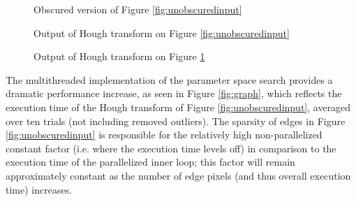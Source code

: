 \documentclass[letterpaper,12pt]{article}
\begin{document}
\begin{figure}[H]
    \caption{Obscured version of Figure \ref{fig:unobscuredinput}}
    \label{fig:obscuredinput}
\end{figure}

\begin{figure}[H]
    \caption{Output of Hough transform on Figure \ref{fig:unobscuredinput}}
    \label{fig:unobscuredoutput}
\end{figure}

\begin{figure}[H]
    \caption{Output of Hough transform on Figure \ref{fig:obscuredinput}}
    \label{fig:obscuredoutput}
\end{figure}
The multithreaded implementation of the parameter space search provides a dramatic performance increase,
as seen in Figure \ref{fig:graph}, which reflects the execution time of the Hough transform of Figure \ref{fig:unobscuredinput},
averaged over ten trials (not including removed outliers). The sparsity of edges in Figure \ref{fig:unobscuredinput}
is responsible for the relatively high non-parallelized constant factor (i.e. where the execution time levels off) in
comparison to the execution time of the parallelized inner loop; this factor will remain approximately constant as the number
of edge pixels (and thus overall execution time) increases.
\end{document}
